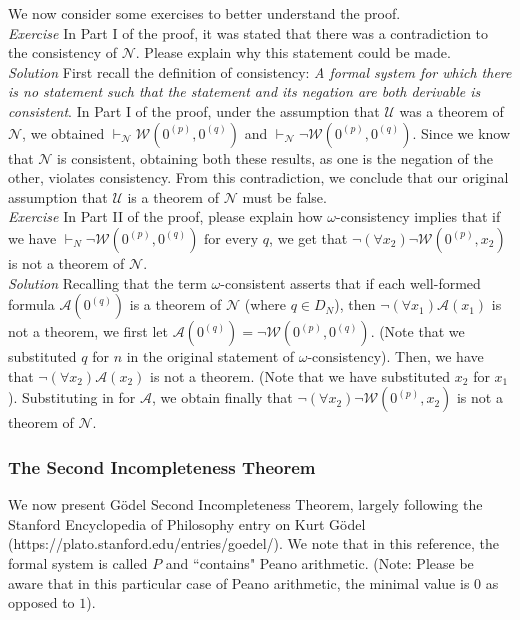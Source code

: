 We now consider some exercises to better understand the proof.\\

\textit{Exercise}  In Part I of the proof, it was stated that there was a contradiction to the consistency of $\mathcal{N}$.  Please explain why this statement could be made.\\

\textit{Solution}  First recall the definition of consistency: \textit{A formal system for which there is no statement such that the statement and its negation are both derivable is consistent}.  In Part I of the proof, under the assumption that $\mathcal{U}$ was a theorem of $\mathcal{N}$, we obtained $\vdash_{\mathcal{N}} \mathcal{W}(0^{(p)}, 0^{(q)})$ and $\vdash_{\mathcal{N}} \neg \mathcal{W}(0^{(p)}, 0^{(q)})$.  Since we know that $\mathcal{N}$ is consistent, obtaining both these results, as one is the negation of the other, violates consistency.  From this contradiction, we conclude that our original assumption that $\mathcal{U}$ is a theorem of $\mathcal{N}$ must be false.\\

\textit{Exercise} In Part II of the proof, please explain how $\omega$-consistency implies that if we have $\vdash_{N} \neg \mathcal{W}(0^{(p)}, 0^{(q)}) \text{ for every }q$, we get that $\neg(\forall x_{2}) \neg \mathcal{W}(0^{(p)}, x_{2})$ is not a theorem of $\mathcal{N}$.\\

\textit{Solution}  Recalling that the term $\omega$-consistent asserts that if each well-formed formula $\mathcal{A}(0^{(q)})$ is a theorem of $\mathcal{N}$ (where $q \in D_{N}$), then $\neg(\forall x_{1})\mathcal{A}(x_{1})$ is not a theorem, we first let $\mathcal{A}(0^{(q)})=\neg \mathcal{W}(0^{(p)}, 0^{(q)})$.  (Note that we substituted $q$ for $n$ in the original statement of $\omega$-consistency).  Then, we have that $\neg(\forall x_{2})\mathcal{A}(x_{2})$ is not a theorem.  (Note that we have substituted $x_{2}$ for $x_{1}$).  Substituting in for $\mathcal{A}$, we obtain finally that  $\neg(\forall x_{2}) \neg \mathcal{W}(0^{(p)}, x_{2})$ is not a theorem of $\mathcal{N}$.


\subsubsection{The Second Incompleteness Theorem}

We now present G\"odel Second Incompleteness Theorem, largely following the Stanford Encyclopedia of Philosophy entry on Kurt G\"odel (https://plato.stanford.edu/entries/goedel/).  We note that in this reference, the formal system is called $P$ and ``contains" Peano arithmetic.  (Note:  Please be aware that in this particular case of Peano arithmetic, the minimal value is $0$ as opposed to $1$).\\

